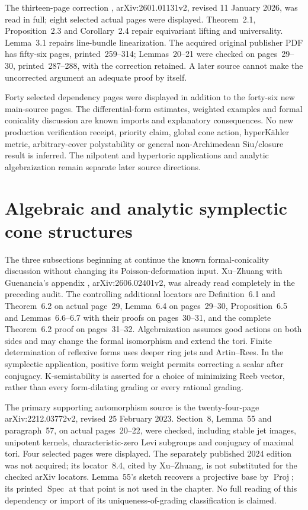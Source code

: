 The thirteen-page correction
\cite{Namikawa26PoissonCorrectionsV2},
arXiv:2601.01131v2, revised 11 January 2026,
was read in full; eight selected actual pages were
displayed. Theorem~2.1, Proposition~2.3 and
Corollary~2.4 repair equivariant lifting and
universality. Lemma~3.1 repairs line-bundle
linearization. The acquired original publisher PDF
\cite{Namikawa08PoissonPublished} has fifty-six
pages, printed~259--314; Lemmas~20--21 were checked
on pages~29--30, printed~287--288, with the
correction retained. A later source cannot make the
uncorrected argument an adequate proof by itself.

Forty selected dependency pages were displayed in
addition to the forty-six new main-source pages.
The differential-form estimates, weighted examples
and formal conicality discussion are known imports
and explanatory consequences. No new production
verification receipt, priority claim, global cone
action, hyperK\"ahler metric, arbitrary-cover
polystability or general non-Archimedean Siu/closure
result is inferred. The nilpotent and hypertoric
applications and analytic algebraization remain
separate later source directions.

\section{Algebraic and analytic symplectic cone structures}
\label{sec:provenance-symplectic-conicality}

The three subsections beginning at
 continue the
known formal-conicality discussion without changing its
Poisson-deformation input. Xu--Zhuang with Guenancia's
appendix \cite{XuZhuang26StableFormsV2},
arXiv:2606.02401v2, was already read completely in the
preceding audit. The controlling additional locators are
Definition~6.1 and Theorem~6.2 on actual page~29,
Lemma~6.4 on pages~29--30, Proposition~6.5 and
Lemmas~6.6--6.7 with their proofs on pages~30--31,
and the complete Theorem~6.2 proof on pages~31--32.
Algebraization assumes good actions on both sides and
may change the formal isomorphism and extend the tori.
Finite determination of reflexive forms uses deeper
ring jets and Artin--Rees. In the symplectic application,
positive form weight permits correcting a scalar after
conjugacy. K-semistability is asserted for a choice of
minimizing Reeb vector, rather than every form-dilating
grading or every rational grading.

The primary supporting automorphism source
\cite{Kollar23InvariantAutomorphismsV2} is the
twenty-four-page arXiv:2212.03772v2, revised
25 February 2023. Section~8, Lemma~55 and
paragraph~57, on actual pages~20--22, were checked,
including stable jet images, unipotent kernels,
characteristic-zero Levi subgroups and conjugacy of
maximal tori. Four selected pages were displayed.
The separately published 2024 edition was not acquired;
its locator~8.4, cited by Xu--Zhuang, is not substituted
for the checked arXiv locators. Lemma~55's sketch
recovers a projective base by $\operatorname{Proj}$;
its printed $\operatorname{Spec}$ at that point is not
used in the chapter. No full reading of this dependency
or import of its uniqueness-of-grading classification
is claimed.

